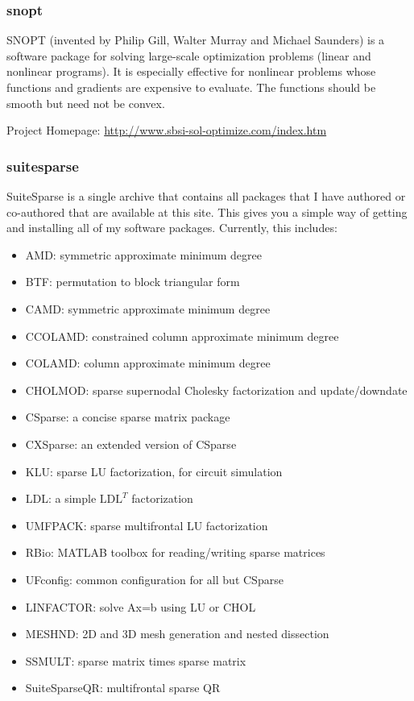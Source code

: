 \subsubsection{snopt}  SNOPT  (invented  by  Philip Gill,  Walter  Murray  and
Michael Saunders)  is a software package for  solving large-scale optimization
problems  (linear and  nonlinear  programs). It  is  especially effective  for
nonlinear   problems  whose   functions   and  gradients   are  expensive   to
evaluate. The functions should be smooth but need not be convex.

\noindent Project Homepage: \url{http://www.sbsi-sol-optimize.com/index.htm}

\subsubsection{suitesparse}
\label{sec:suitesparse}

SuiteSparse  is  a single  archive  that contains  all  packages  that I  have
authored or  co-authored that  are available  at this site.  This gives  you a
simple way of  getting and installing all of  my software packages. Currently,
this includes:

\begin{itemize}
\item AMD: symmetric approximate minimum degree
\item BTF: permutation to block triangular form
\item CAMD: symmetric approximate minimum degree
\item CCOLAMD: constrained column approximate minimum degree
\item COLAMD: column approximate minimum degree
\item CHOLMOD: sparse supernodal Cholesky factorization and update/downdate
\item CSparse: a concise sparse matrix package
\item CXSparse: an extended version of CSparse
\item KLU: sparse LU factorization, for circuit simulation
\item LDL: a simple $\textrm{LDL}^T$ factorization
\item UMFPACK: sparse multifrontal LU factorization
\item RBio: MATLAB toolbox for reading/writing sparse matrices
\item UFconfig: common configuration for all but CSparse
\item LINFACTOR: solve Ax=b using LU or CHOL
\item MESHND: 2D and 3D mesh generation and nested dissection
\item SSMULT: sparse matrix times sparse matrix
\item SuiteSparseQR: multifrontal sparse QR 
\end{itemize}

